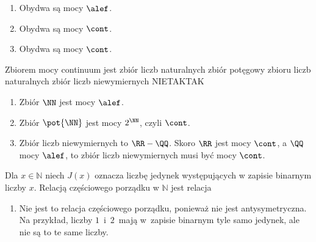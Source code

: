 \begin{solutions}
    \begin{enumerate}[\bf A.]
        \item Obydwa są mocy $\alef$.
        \item Obydwa są mocy $\cont$.
        \item Obydwa są mocy $\cont$.
    \end{enumerate}

    \sol Zbiorem mocy continuum jest
    \answerss
    {zbiór liczb naturalnych}
    {zbiór potęgowy zbioru liczb naturalnych}
    {zbiór liczb niewymiernych}
    {NIE}{TAK}{TAK}

    \begin{enumerate}[\bf A.]
        \item Zbiór $\NN$ jest mocy $\alef$.
        \item Zbiór $\pot{\NN}$ jest mocy $2^\NN$, czyli $\cont$.
        \item Zbiór liczb niewymiernych to $\RR-\QQ$. Skoro $\RR$ jest mocy $\cont$, a $\QQ$ mocy $\alef$, to zbiór liczb niewymiernych musi być mocy $\cont$.
    \end{enumerate}
    
    \sol Dla $x \in \mathbb{N}$ niech $J(x)$ oznacza liczbę jedynek występujących w zapisie binarnym liczby $x$. Relacją częściowego porządku w $\mathbb{N}$ jest relacja

    \begin{enumerate}[\bf A.]
        \item Nie jest to relacja częściowego porządku, ponieważ nie jest antysymetryczna. Na przykład, liczby $1$~i~$2$~mają w~zapisie binarnym tyle samo jedynek, ale nie są to te same liczby.


\end{enumerate}
\end{solutions}

